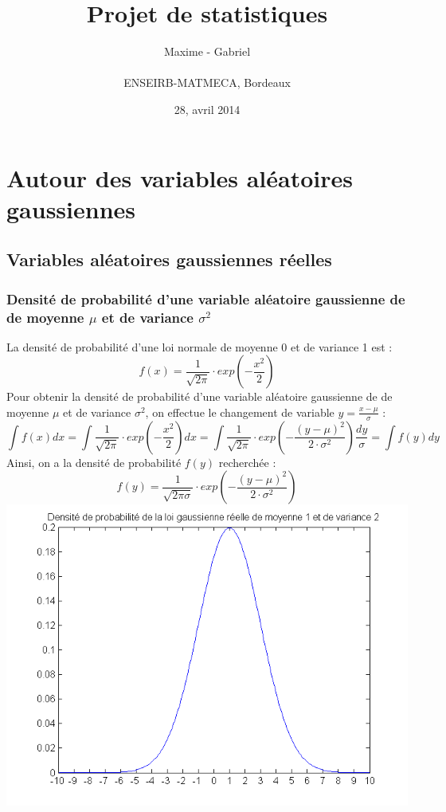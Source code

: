 \documentclass{report}
\title{\textbf{Projet de statistiques}}
\author{{Maxime \bsc{Peterlin} - Gabriel \bsc{Vermeulen} }\\\\{ENSEIRB-MATMECA, Bordeaux}}
\date{28, avril 2014}
\begin{document}
\maketitle

\tableofcontents

\chapter{Autour des variables aléatoires gaussiennes}
	\section{Variables aléatoires gaussiennes réelles}
		\subsection{Densité de probabilité d'une variable aléatoire gaussienne de de moyenne $\mu$ et de variance $\sigma^2$}
			La densité de probabilité d'une loi normale de moyenne 0 et de variance 1 est :
			\[f(x) = \frac{1}{\sqrt{2\pi}} \cdot exp(-\frac{x^2}{2}) \]
			Pour obtenir la densité de probabilité d'une variable aléatoire gaussienne de de moyenne $\mu$ et de variance $\sigma^2$, on effectue le changement de variable $y = \frac{x-\mu}{\sigma}$ :
			\[\int f(x)dx = \int \frac{1}{\sqrt{2\pi}} \cdot exp(-\frac{x^2}{2})dx = \int \frac{1}{\sqrt{2\pi}} \cdot exp(-\frac{(y-\mu)^2}{2\cdot \sigma^2})\frac{dy}{\sigma} = \int f(y)dy \]
			Ainsi, on a la densité de probabilité $f(y)$ recherchée :
			\[f(y) = \frac{1}{\sqrt{2\pi \sigma}} \cdot exp(-\frac{(y-\mu)^2}{2\cdot \sigma^2}) \]
			\includegraphics[scale=0.7]{sources/Q211.png} 
\end{document}
